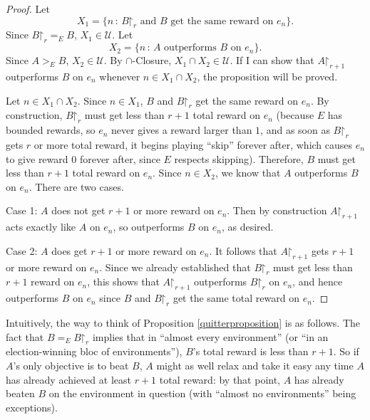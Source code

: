 \documentclass[twoside,11pt]{article}
\begin{document}
\begin{proof}
    Let
    \[
        X_1=\{n\,:\,\mbox{$B\mathord{\restriction}_r$ and $B$ get the same reward on $e_n$}\}.
    \]
    Since $B\mathord{\restriction}_r=_{E}B$, $X_1\in \mathscr U$.
    Let
    \[
        X_2=\{n\,:\,\mbox{$A$ outperforms $B$ on $e_n$}\}.
    \]
    Since $A>_{E}B$, $X_2\in\mathscr U$.
    By $\cap$-Closure, $X_1\cap X_2\in\mathscr U$.
    If I can show that $A\mathord{\restriction}_{r+1}$ outperforms
    $B$ on $e_n$ whenever $n\in X_1\cap X_2$,
    the proposition will be proved.

    Let $n\in X_1\cap X_2$.
    Since $n\in X_1$, $B$ and $B\mathord{\restriction}_r$ get the same reward on $e_n$.
    By construction, $B\mathord{\restriction}_r$ must get less than $r+1$ total reward on $e_n$
    (because $E$ has bounded rewards,
    so $e_n$ never gives a reward larger than $1$,
    and as soon as $B\mathord{\restriction}_r$ gets $r$ or more total reward,
    it begins playing ``skip'' forever after, which causes $e_n$ to give
    reward $0$ forever after, since $E$ respects skipping).
    Therefore, $B$ must get less than $r+1$
    total reward on $e_n$.
    Since $n\in X_2$, we know that $A$ outperforms $B$ on $e_n$. There are two cases.

    Case 1: $A$ does not get $r+1$ or more reward on $e_n$. Then by construction
    $A\mathord{\restriction}_{r+1}$ acts exactly like $A$ on $e_n$, so
    outperforms $B$ on $e_n$, as desired.

    Case 2: $A$ does get $r+1$ or more reward on $e_n$. It follows
    that $A\mathord{\restriction}_{r+1}$
    gets $r+1$ or more reward on $e_n$. Since we already
    established that $B\mathord{\restriction}_r$
    must get less than $r+1$ reward on $e_n$, this shows that $A\mathord{\restriction}_{r+1}$
    outperforms $B\mathord{\restriction}_r$ on $e_n$, and hence outperforms $B$ on $e_n$ since
    $B$ and $B\mathord{\restriction}_r$ get the same total reward on $e_n$.
\end{proof}

Intuitively, the way to think of Proposition \ref{quitterproposition} is as follows.
The fact that $B=_{E}B\mathord{\restriction}_r$ implies that
in ``almost every environment'' (or ``in an election-winning bloc of environments''),
$B$'s total reward is less than $r+1$.
So if $A$'s only objective is to beat $B$, $A$ might as well relax and take it easy
any time $A$ has already achieved at least $r+1$ total reward: by that point, $A$ has
already beaten $B$ on the environment in
question (with ``almost no environments'' being exceptions).
\end{document}
